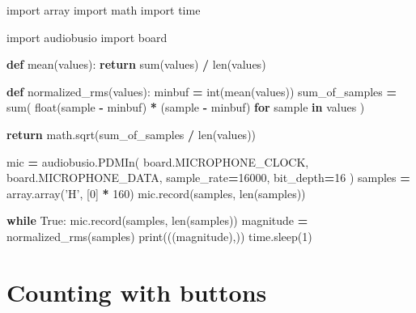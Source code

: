 \documentclass[
]{book}
\newenvironment{Shaded}{\begin{snugshade}}{\end{snugshade}}
\newcommand{\BuiltInTok}[1]{#1}
\newcommand{\ControlFlowTok}[1]{\textcolor[rgb]{0.13,0.29,0.53}{\textbf{#1}}}
\newcommand{\DecValTok}[1]{\textcolor[rgb]{0.00,0.00,0.81}{#1}}
\newcommand{\ImportTok}[1]{#1}
\newcommand{\KeywordTok}[1]{\textcolor[rgb]{0.13,0.29,0.53}{\textbf{#1}}}
\newcommand{\NormalTok}[1]{#1}
\newcommand{\OperatorTok}[1]{\textcolor[rgb]{0.81,0.36,0.00}{\textbf{#1}}}
\newcommand{\StringTok}[1]{\textcolor[rgb]{0.31,0.60,0.02}{#1}}
\newcommand{\VariableTok}[1]{\textcolor[rgb]{0.00,0.00,0.00}{#1}}
\begin{document}
\begin{Shaded}
\begin{Highlighting}[]
\ImportTok{import}\NormalTok{ array}
\ImportTok{import}\NormalTok{ math}
\ImportTok{import}\NormalTok{ time}

\ImportTok{import}\NormalTok{ audiobusio}
\ImportTok{import}\NormalTok{ board}


\KeywordTok{def}\NormalTok{ mean(values):}
    \ControlFlowTok{return} \BuiltInTok{sum}\NormalTok{(values) }\OperatorTok{/} \BuiltInTok{len}\NormalTok{(values)}


\KeywordTok{def}\NormalTok{ normalized_rms(values):}
\NormalTok{    minbuf }\OperatorTok{=} \BuiltInTok{int}\NormalTok{(mean(values))}
\NormalTok{    sum_of_samples }\OperatorTok{=} \BuiltInTok{sum}\NormalTok{(}
        \BuiltInTok{float}\NormalTok{(sample }\OperatorTok{-}\NormalTok{ minbuf) }\OperatorTok{*}\NormalTok{ (sample }\OperatorTok{-}\NormalTok{ minbuf)}
        \ControlFlowTok{for}\NormalTok{ sample }\KeywordTok{in}\NormalTok{ values}
\NormalTok{    )}

    \ControlFlowTok{return}\NormalTok{ math.sqrt(sum_of_samples }\OperatorTok{/} \BuiltInTok{len}\NormalTok{(values))}


\NormalTok{mic }\OperatorTok{=}\NormalTok{ audiobusio.PDMIn(}
\NormalTok{    board.MICROPHONE_CLOCK,}
\NormalTok{    board.MICROPHONE_DATA,}
\NormalTok{    sample_rate}\OperatorTok{=}\DecValTok{16000}\NormalTok{,}
\NormalTok{    bit_depth}\OperatorTok{=}\DecValTok{16}
\NormalTok{)}
\NormalTok{samples }\OperatorTok{=}\NormalTok{ array.array(}\StringTok{'H'}\NormalTok{, [}\DecValTok{0}\NormalTok{] }\OperatorTok{*} \DecValTok{160}\NormalTok{)}
\NormalTok{mic.record(samples, }\BuiltInTok{len}\NormalTok{(samples))}

\ControlFlowTok{while} \VariableTok{True}\NormalTok{:}
\NormalTok{    mic.record(samples, }\BuiltInTok{len}\NormalTok{(samples))}
\NormalTok{    magnitude }\OperatorTok{=}\NormalTok{ normalized_rms(samples)}
    \BuiltInTok{print}\NormalTok{(((magnitude),))}
\NormalTok{    time.sleep(}\DecValTok{1}\NormalTok{)}
\end{Highlighting}
\end{Shaded}

\hypertarget{counting-with-buttons}{%
\chapter{Counting with buttons}\label{counting-with-buttons}}
\end{document}
